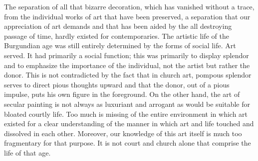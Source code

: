 The separation of all that bizarre decoration, which has vanished
without a trace, from the individual works of art that have been
preserved, a separation that our appreciation of art demands and that
has been aided by the all destroying passage of time, hardly existed for
contemporaries. The artistic life of the Burgundian age was still
entirely determined by the forms of social life. Art served. It had
primarily a social function; this was primarily to display splendor and
to emphasize the importance of the individual, not the artist but rather
the donor. This is not contradicted by the fact
\protect\hypertarget{20_ILLUSTRATIONS_FOLLOW_PAGE.xhtmlux5cux23page_312}{}{}that
in church art, pompous splendor serves to direct pious thoughts upward
and that the donor, out of a pious impulse, puts his own figure in the
foreground. On the other hand, the art of secular painting is not always
as luxuriant and arrogant as would be suitable for bloated courtly life.
Too much is missing of the entire environment in which art existed for a
clear understanding of the manner in which art and life touched and
dissolved in each other. Moreover, our knowledge of this art itself is
much too fragmentary for that purpose. It is not court and church alone
that comprise the life of that age.

